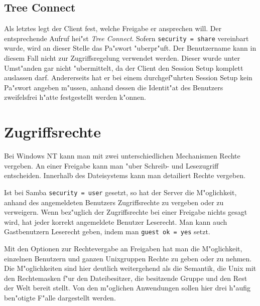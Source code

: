 \documentclass{scrartcl}
\newcommand{\param}{\texttt}
\newcommand{\defin}{\emph}
\begin{document}
\subsection*{Tree Connect}

Als letztes legt der Client fest, welche Freigabe er ansprechen will.
Der entsprechende Aufruf hei"st \defin{Tree Connect}. Sofern
\param{security = share} vereinbart wurde, wird an dieser Stelle das
Pa"swort "uberpr"uft. Der Benutzername kann in diesem Fall nicht zur
Zugriffsregelung verwendet werden. Dieser wurde unter Umst"anden gar
nicht "ubermittelt, da der Client den Session Setup komplett auslassen
darf. Andererseits hat er bei einem durchgef"uhrten Session Setup kein
Pa"swort angeben m"ussen, anhand dessen die Identit"at des Benutzers
zweifelsfrei h"atte festgestellt werden k"onnen.

\section{Zugriffsrechte}

Bei Windows NT kann man mit zwei unterschiedlichen Mechanismen Rechte
vergeben. An einer Freigabe kann man "uber Schreib- und Lesezugriff
entscheiden. Innerhalb des Dateisystems kann man detailiert Rechte
vergeben.

Ist bei Samba \param{security = user} gesetzt, so hat der Server die
M"oglichkeit, anhand des angemeldeten Benutzers Zugriffsrechte zu
vergeben oder zu verweigern. Wenn bez"uglich der Zugriffsrechte bei
einer Freigabe nichts gesagt wird, hat jeder korrekt angemeldete
Benutzer Leserecht. Man kann auch Gastbenutzern Leserecht geben, indem
man \param{guest ok = yes} setzt.

Mit den Optionen zur Rechtevergabe an Freigaben hat man die
M"oglichkeit, einzelnen Benutzern und ganzen Unixgruppen Rechte zu
geben oder zu nehmen. Die M"oglichkeiten sind hier deutlich weitergehend 
als die Semantik, die Unix mit den Rechtemasken f"ur den
Dateibesitzer, die besitzende Gruppe und den Rest der Welt bereit
stellt. Von den m"oglichen Anwendungen sollen hier drei h"aufig
ben"otigte F"alle dargestellt werden.
\end{document}
